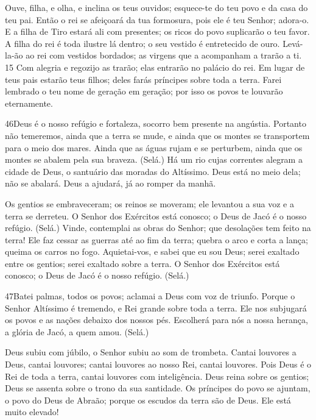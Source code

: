 Ouve, filha, e olha, e inclina os teus ouvidos; esquece-te do teu
povo e da casa do teu pai. Então o rei se afeiçoará da tua
formosura, pois ele é teu Senhor; adora-o. E a filha de Tiro
estará ali com presentes; os ricos do povo suplicarão o teu favor.
A filha do rei é toda ilustre lá dentro; o seu vestido é
entretecido de ouro. Levá-la-ão ao rei com vestidos bordados;
as virgens que a acompanham a trarão a ti. 15 Com alegria e regozijo
as trarão; elas entrarão no palácio do rei. Em lugar de teus
pais estarão teus filhos; deles farás príncipes sobre toda a terra.
Farei lembrado o teu nome de geração em geração; por isso os
povos te louvarão eternamente.

\bigskip

\lettrine{46}{}Deus é o nosso refúgio e fortaleza, socorro bem
presente na angústia. Portanto não temeremos, ainda que a terra
se mude, e ainda que os montes se transportem para o meio dos mares.
Ainda que as águas rujam e se perturbem, ainda que os montes se
abalem pela sua braveza. (Selá.) Há um rio cujas correntes
alegram a cidade de Deus, o santuário das moradas do Altíssimo.
Deus está no meio dela; não se abalará. Deus a ajudará, já ao
romper da manhã.

Os gentios se embraveceram; os reinos se moveram; ele levantou a
sua voz e a terra se derreteu. O Senhor dos Exércitos está
conosco; o Deus de Jacó é o nosso refúgio. (Selá.) Vinde,
contemplai as obras do Senhor; que desolações tem feito na terra!
Ele faz cessar as guerras até ao fim da terra; quebra o arco e
corta a lança; queima os carros no fogo. Aquietai-vos, e
sabei que eu sou Deus; serei exaltado entre os gentios; serei
exaltado sobre a terra. O Senhor dos Exércitos está conosco;
o Deus de Jacó é o nosso refúgio. (Selá.)

\bigskip

\lettrine{47}{}Batei palmas, todos os povos; aclamai a Deus com
voz de triunfo. Porque o Senhor Altíssimo é tremendo, e Rei
grande sobre toda a terra. Ele nos subjugará os povos e as
nações debaixo dos nossos pés. Escolherá para nós a nossa
herança, a glória de Jacó, a quem amou. (Selá.)

Deus subiu com júbilo, o Senhor subiu ao som de trombeta.
Cantai louvores a Deus, cantai louvores; cantai louvores ao
nosso Rei, cantai louvores. Pois Deus é o Rei de toda a terra,
cantai louvores com inteligência. Deus reina sobre os gentios;
Deus se assenta sobre o trono da sua santidade. Os príncipes do
povo se ajuntam, o povo do Deus de Abraão; porque os escudos da
terra são de Deus. Ele está muito elevado!

